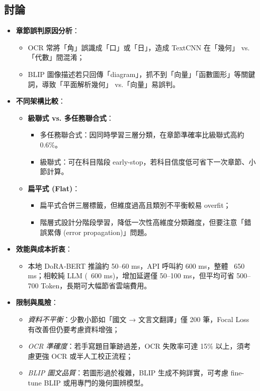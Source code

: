 \documentclass[10pt]{article}
\begin{document}
\begin{CJK}{UTF8}{bsmi}
\section{討論}
\begin{itemize}
  \item \textbf{章節誤判原因分析}：  
    \begin{itemize}
      \item OCR 常將「角」誤識成「口」或「日」，造成 TextCNN 在「幾何」 vs.「代數」間混淆；  
      \item BLIP 圖像描述若只回傳「diagram」，抓不到「向量」「函數圖形」等關鍵詞，導致「平面解析幾何」 vs.「向量」易誤判。  
    \end{itemize}
  \item \textbf{不同架構比較}：  
    \begin{itemize}
      \item \textbf{級聯式 vs. 多任務聯合式}：  
        \begin{itemize}
          \item 多任務聯合式：因同時學習三層分類，在章節準確率比級聯式高約 0.6\%。  
          \item 級聯式：可在科目階段 early-stop，若科目信度低可省下一次章節、小節計算。  
        \end{itemize}
      \item \textbf{扁平式 (Flat)}：  
        \begin{itemize}
          \item 扁平式合併三層標籤，但維度過高且類別不平衡較易 overfit；  
          \item 階層式設計分階段學習，降低一次性高維度分類難度，但要注意「錯誤累傳 (error propagation)」問題。
        \end{itemize}
    \end{itemize}
  \item \textbf{效能與成本折衷}：  
    \begin{itemize}
      \item 本地 DoRA‐BERT 推論約 50–60 ms，API 呼叫約 600 ms，整體 ~650 ms；相較純 LLM (~600 ms)，增加延遲僅 50–100 ms，但平均可省 500–700 Token，長期可大幅節省雲端費用。  
    \end{itemize}
  \item \textbf{限制與風險}：  
    \begin{itemize}
      \item \emph{資料不平衡}：少數小節如「國文 → 文言文翻譯」僅 200 筆，Focal Loss 有改善但仍要考慮資料增強；  
      \item \emph{OCR 準確度}：若手寫題目筆跡過差，OCR 失敗率可達 15\% 以上，須考慮更強 OCR 或半人工校正流程；  
      \item \emph{BLIP 圖文品質}：若圖形過於複雜，BLIP 生成不夠詳實，可考慮 fine-tune BLIP 或用專門的幾何圖辨模型。
    \end{itemize}
\end{itemize}


\end{CJK}
\end{document}
